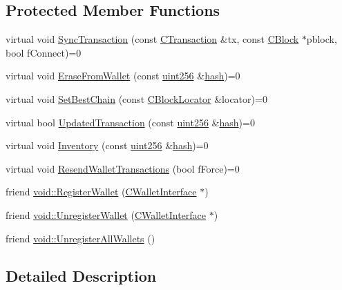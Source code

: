 \subsection*{Protected Member Functions}
\begin{DoxyCompactItemize}
\item 
virtual void \hyperlink{class_c_wallet_interface_a7bde8e284f9405dd858c9b4cbf960ae5}{Sync\+Transaction} (const \hyperlink{class_c_transaction}{C\+Transaction} \&tx, const \hyperlink{class_c_block}{C\+Block} $\ast$pblock, bool f\+Connect)=0
\item 
virtual void \hyperlink{class_c_wallet_interface_a209e0de8725bab3274e7d79567cca630}{Erase\+From\+Wallet} (const \hyperlink{classuint256}{uint256} \&\hyperlink{cache_8cc_a11ecb029164e055f28f4123ce3748862}{hash})=0
\item 
virtual void \hyperlink{class_c_wallet_interface_ac9c87a58906081f6629f3f82439dad8e}{Set\+Best\+Chain} (const \hyperlink{class_c_block_locator}{C\+Block\+Locator} \&locator)=0
\item 
virtual bool \hyperlink{class_c_wallet_interface_a07b55d9aede02e25a5e8d8027c67954f}{Updated\+Transaction} (const \hyperlink{classuint256}{uint256} \&\hyperlink{cache_8cc_a11ecb029164e055f28f4123ce3748862}{hash})=0
\item 
virtual void \hyperlink{class_c_wallet_interface_a32858e2bb7bb6cb81ac391e0e2a0d4c1}{Inventory} (const \hyperlink{classuint256}{uint256} \&\hyperlink{cache_8cc_a11ecb029164e055f28f4123ce3748862}{hash})=0
\item 
virtual void \hyperlink{class_c_wallet_interface_acd71e9479057c2fdc433fc576e625edf}{Resend\+Wallet\+Transactions} (bool f\+Force)=0
\item 
friend \hyperlink{class_c_wallet_interface_a41e0e5970c0b64bcd32e7b32a6f5eb5a}{void\+::\+Register\+Wallet} (\hyperlink{class_c_wallet_interface}{C\+Wallet\+Interface} $\ast$)
\item 
friend \hyperlink{class_c_wallet_interface_aa2fc3f0cc9beaf7af22aebcb100496c6}{void\+::\+Unregister\+Wallet} (\hyperlink{class_c_wallet_interface}{C\+Wallet\+Interface} $\ast$)
\item 
friend \hyperlink{class_c_wallet_interface_a6d88a52257aa88c49ec9a82549003c3c}{void\+::\+Unregister\+All\+Wallets} ()
\end{DoxyCompactItemize}


\subsection{Detailed Description}



